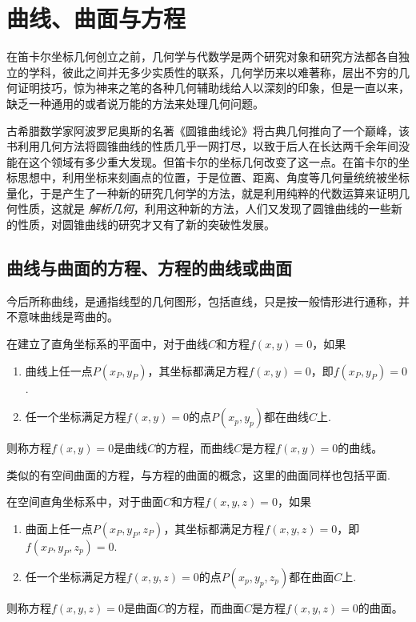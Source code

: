 
\section{曲线、曲面与方程}
\label{sec:curve-and-equation}

在笛卡尔坐标几何创立之前，几何学与代数学是两个研究对象和研究方法都各自独立的学科，彼此之间并无多少实质性的联系，几何学历来以难著称，层出不穷的几何证明技巧，惊为神来之笔的各种几何辅助线给人以深刻的印象，但是一直以来，缺乏一种通用的或者说万能的方法来处理几何问题。

古希腊数学家阿波罗尼奥斯的名著《圆锥曲线论》将古典几何推向了一个巅峰，该书利用几何方法将圆锥曲线的性质几乎一网打尽，以致于后人在长达两千余年间没能在这个领域有多少重大发现。但笛卡尔的坐标几何改变了这一点。在笛卡尔的坐标思想中，利用坐标来刻画点的位置，于是位置、距离、角度等几何量统统被坐标量化，于是产生了一种新的研究几何学的方法，就是利用纯粹的代数运算来证明几何性质，这就是 \emph{解析几何}，利用这种新的方法，人们又发现了圆锥曲线的一些新的性质，对圆锥曲线的研究才又有了新的突破性发展。

\subsection{曲线与曲面的方程、方程的曲线或曲面}
\label{sec:equation-of-curve-and-curve-of-equation}

今后所称曲线，是通指线型的几何图形，包括直线，只是按一般情形进行通称，并不意味曲线是弯曲的。

\begin{definition}
  在建立了直角坐标系的平面中，对于曲线$C$和方程$f(x,y)=0$，如果
  \begin{enumerate}
  \item 曲线上任一点$P(x_P,y_P)$，其坐标都满足方程$f(x,y)=0$，即$f(x_P,y_P)=0$.
  \item 任一个坐标满足方程$f(x,y)=0$的点$P(x_p,y_p)$都在曲线$C$上.
  \end{enumerate}
  则称方程$f(x,y)=0$是曲线$C$的方程，而曲线$C$是方程$f(x,y)=0$的曲线。
\end{definition}

类似的有空间曲面的方程，与方程的曲面的概念，这里的曲面同样也包括平面.

\begin{definition}
  在空间直角坐标系中，对于曲面$C$和方程$f(x,y,z)=0$，如果
  \begin{enumerate}
  \item 曲面上任一点$P(x_P,y_P,z_P)$，其坐标都满足方程$f(x,y,z)=0$，即$f(x_P,y_P,z_p)=0$.
  \item 任一个坐标满足方程$f(x,y,z)=0$的点$P(x_p,y_p,z_p)$都在曲面$C$上.
  \end{enumerate}
  则称方程$f(x,y,z)=0$是曲面$C$的方程，而曲面$C$是方程$f(x,y,z)=0$的曲面。
\end{definition}

